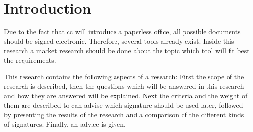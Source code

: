 \section{Introduction}
Due to the fact that \gls{cc} will introduce a paperless office, all possible documents should be signed electronic. Therefore, several tools already exist. Inside this research a market research should be done about the topic which tool will fit best the requirements. 

This research contains the following aspects of a research: First the scope of the research is described, then the questions which will be answered in this research and how they are answered will be explained. Next the criteria and the weight of them are described to can advise which signature should be used later, followed by presenting the results of the research and a comparison of the different kinds of signatures. Finally, an advice is given.  